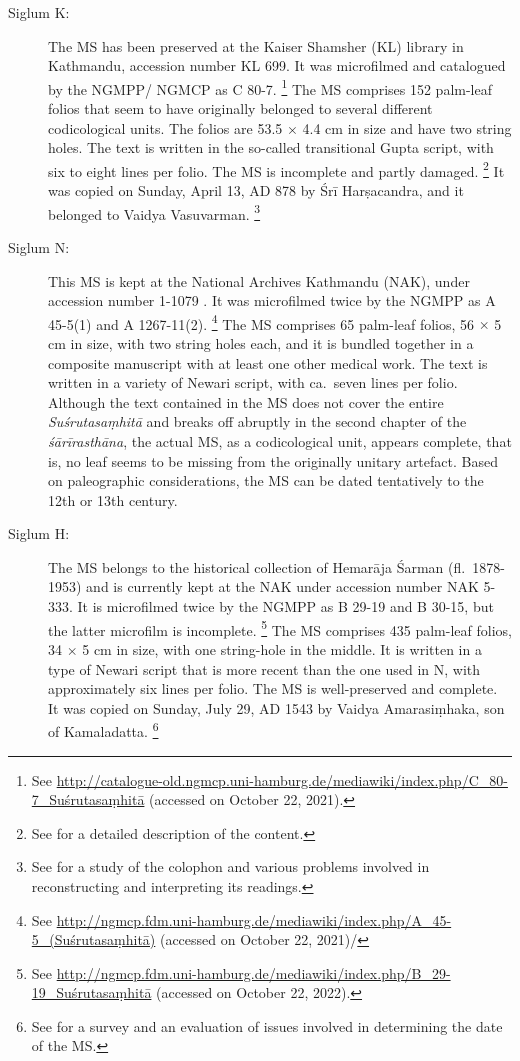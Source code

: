 \begin{description}
\item[Siglum K:] The MS has been preserved at the Kaiser Shamsher (KL) library in Kathmandu, accession number KL 699. It was microfilmed and catalogued by the NGMPP/ NGMCP as C 80-7.%
    \footnote{%
    See 
    \url{http://catalogue-old.ngmcp.uni-hamburg.de/mediawiki/index.php/C_80-7_Suśrutasaṃhitā}
     (accessed on October 22, 2021).%
    } 
The MS comprises 152 palm-leaf folios that seem to have originally belonged to several different codicological units. The folios are 53.5 $\times$ 4.4 cm in size and have two string holes.  The text is written in the so-called transitional Gupta script, with six to eight lines per folio. The MS is incomplete and partly damaged.%
    \footnote{%
    See \textcites[11]{kleb-2021b} for a detailed description of the content.%
    }
It was copied on Sunday, April 13, AD 878 by Śrī Harṣacandra, and it belonged to Vaidya Vasuvarman.%
    \footnote{%
    See \textcites[13--17]{kleb-2021b} for a study of the colophon and various problems involved in reconstructing and interpreting its readings.%
    }

\item[Siglum N:] This MS is kept at the National Archives Kathmandu (NAK), under accession number 1-1079 . It was microfilmed twice by the NGMPP as A 45-5(1) and A 1267-11(2).%
    \footnote{%
See 
\url{http://ngmcp.fdm.uni-hamburg.de/mediawiki/index.php/A_45-5_(Suśrutasaṃhitā)}
 (accessed on October 22, 2021)/
    } 
The MS comprises 65 palm-leaf folios, 56 $\times$ 5 cm in size, with two string holes each, and it is bundled together in a composite manuscript with at least one other medical work. The text is written in a variety of Newari script, with ca.\ seven lines per folio. Although the text contained in the MS does not cover the entire \emph{Suśrutasaṃhitā} and breaks off abruptly in the second chapter of the \emph{śārīrasthāna}, the actual MS, as a codicological unit, appears complete, that is, no leaf seems to be missing from the originally unitary artefact. Based on paleographic considerations, the MS can be dated tentatively to the 12th or 13th century.

\item[Siglum H:] The MS belongs to the historical collection of Hemarāja Śarman (fl.\ 1878-1953) and is currently kept at the NAK under accession number NAK 5-333. It is microfilmed twice by the NGMPP as B 29-19 and B 30-15, but the latter microfilm is incomplete.%
    \footnote{%
    See 
    \url{http://ngmcp.fdm.uni-hamburg.de/mediawiki/index.php/B_29-19_Suśrutasaṃhitā}
     (accessed on October 22, 2022).
    } 
The MS comprises 435 palm-leaf folios, 34 $\times$ 5 cm in size, with one string-hole in the middle. It is written in a type of Newari script that is more recent than the one used in N, with approximately six lines per folio. The MS is well-preserved and complete. It was copied on Sunday, July 29, AD 1543 by Vaidya Amarasiṃhaka, son of Kamaladatta.%
    \footnote{%
    See \textcites[21--26]{kleb-2021b} for a survey and an evaluation of issues involved in determining the date of the MS.%
    }
\end{description}
  
